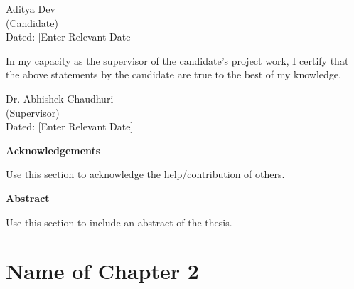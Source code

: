 \documentclass[a4paper, 12pt,  twoside,]{report}
\begin{document}
\vspace{2cm}

\begin{flushright}
Aditya Dev
\\
(Candidate)
\\
Dated: [Enter Relevant Date]
\end{flushright}

In my capacity as the supervisor of the candidate's project work, I certify that the above statements by the candidate are true to the best of my knowledge.

\vspace{2cm}

\begin{flushright}
Dr. Abhishek Chaudhuri
\\
(Supervisor)
\\
Dated: [Enter Relevant Date]
\end{flushright}

\cleardoublepage

\begin{center}
\textbf{\Large Acknowledgements}
\end{center}

Use this section to acknowledge the help/contribution of others.


\newpage
\begin{center}
    \textbf{\Large Abstract}
\end{center}

Use this section to include an abstract of the thesis.

\newpage
\restoregeometry

\listoffigures

\newpage

\listoftables

\tableofcontents

\newpage

\rmfamily



\clearpage

\newpage
\chapter{Name of Chapter 2}\label{chap:chapter2}
\end{document}
